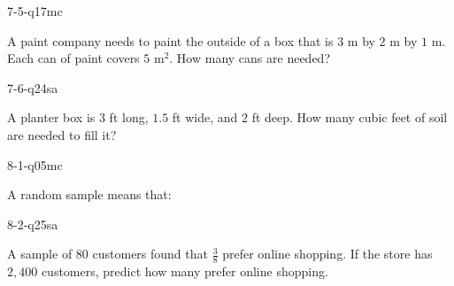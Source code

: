 \begin{practiceQuestion}{7-5-q17}{mc}
\begin{questionText}
A paint company needs to paint the outside of a box that is $3$ m by $2$ m by $1$ m. Each can of paint covers $5$ m$^2$. How many cans are needed?
\end{questionText}
\end{practiceQuestion}

\begin{practiceQuestion}{7-6-q24}{sa}
\begin{questionText}
A planter box is $3$ ft long, $1.5$ ft wide, and $2$ ft deep. How many cubic feet of soil are needed to fill it?
\end{questionText}
\end{practiceQuestion}

\begin{practiceQuestion}{8-1-q05}{mc}
\begin{questionText}
A random sample means that:
\end{questionText}
\end{practiceQuestion}

\begin{practiceQuestion}{8-2-q25}{sa}
\begin{questionText}
A sample of $80$ customers found that $\frac{3}{8}$ prefer online shopping. If the store has $2{,}400$ customers, predict how many prefer online shopping.
\end{questionText}
\end{practiceQuestion}

